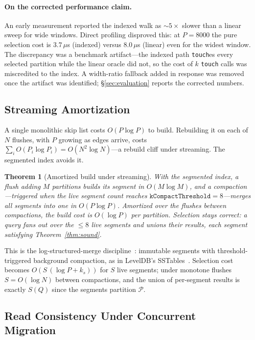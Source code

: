 \documentclass[10pt]{article}
\newtheorem{theorem}{Theorem}
\theoremstyle{definition}
\begin{document}
\paragraph{On the corrected performance claim.}
An early measurement reported the indexed walk as ${\sim}5\times$ slower than a
linear sweep for wide windows. Direct profiling disproved this: at $P=8000$ the
pure selection cost is $3.7\,\mu$s (indexed) versus $8.0\,\mu$s (linear) even for
the widest window. The discrepancy was a benchmark artifact---the indexed path
\texttt{touch}es every selected partition while the linear oracle did not, so the
cost of $k$ \texttt{touch} calls was miscredited to the index. A width-ratio
fallback added in response was removed once the artifact was identified;
\S\ref{sec:evaluation} reports the corrected numbers.

\subsection{Streaming Amortization}
\label{sec:amort}

A single monolithic skip list costs $O(P\log P)$ to build. Rebuilding it on each
of $N$ flushes, with $P$ growing as edges arrive, costs
$\sum_i O(P_i\log P_i)=O(N^2\log N)$---a rebuild cliff under streaming. The
segmented index avoids it.

\begin{theorem}[Amortized build under streaming]
\label{thm:amort}
With the segmented index, a flush adding $M$ partitions builds its segment in
$O(M\log M)$, and a compaction---triggered when the live segment count reaches
$\texttt{kCompactThreshold}=8$---merges all segments into one in $O(P\log P)$.
Amortized over the flushes between compactions, the build cost is $O(\log P)$ per
partition. Selection stays correct: a query fans out over the $\le 8$ live
segments and unions their results, each segment satisfying
Theorem~\ref{thm:sound}.
\end{theorem}

This is the log-structured-merge discipline~\citep{oneil1996lsm}: immutable
segments with threshold-triggered background compaction, as in LevelDB's
SSTables~\citep{leveldb}. Selection cost becomes $O(S\,(\log P + k_s))$ for $S$
live segments; under monotone flushes $S=O(\log N)$ between compactions, and the
union of per-segment results is exactly $S(Q)$ since the segments partition
$\mathcal{P}$.

\subsection{Read Consistency Under Concurrent Migration}
\label{sec:consistency}
\end{document}
